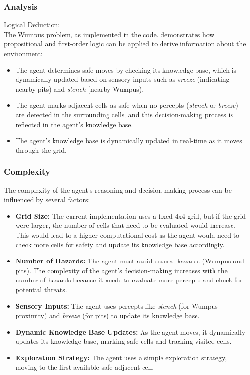 \documentclass[12pt]{article}
\begin{document}
\subsubsection{Analysis}
Logical Deduction: \\
The Wumpus problem, as implemented in the code, demonstrates how propositional and first-order logic can be applied to derive information about the environment:
\begin{itemize}
    \item The agent determines safe moves by checking its knowledge base, which is dynamically updated based on sensory inputs such as \textit{breeze} (indicating nearby pits) and \textit{stench} (nearby Wumpus).
    \item The agent marks adjacent cells as safe when no percepts (\textit{stench} or \textit{breeze}) are detected in the surrounding cells, and this decision-making process is reflected in the agent’s knowledge base.
    \item The agent's knowledge base is dynamically updated in real-time as it moves through the grid.
\end{itemize}

\subsubsection{Complexity}
The complexity of the agent’s reasoning and decision-making process can be influenced by several factors:

\begin{itemize}
    \item \textbf{Grid Size:} The current implementation uses a fixed 4x4 grid, but if the grid were larger, the number of cells that need to be evaluated would increase. This would lead to a higher computational cost as the agent would need to check more cells for safety and update its knowledge base accordingly.

    \item \textbf{Number of Hazards:} The agent must avoid several hazards (Wumpus and pits). The complexity of the agent’s decision-making increases with the number of hazards because it needs to evaluate more percepts and check for potential threats.

    \item \textbf{Sensory Inputs:} The agent uses percepts like \textit{stench} (for Wumpus proximity) and \textit{breeze} (for pits) to update its knowledge base.

    \item \textbf{Dynamic Knowledge Base Updates:} As the agent moves, it dynamically updates its knowledge base, marking safe cells and tracking visited cells.

    \item \textbf{Exploration Strategy:} The agent uses a simple exploration strategy, moving to the first available safe adjacent cell.
\end{itemize}
\end{document}
